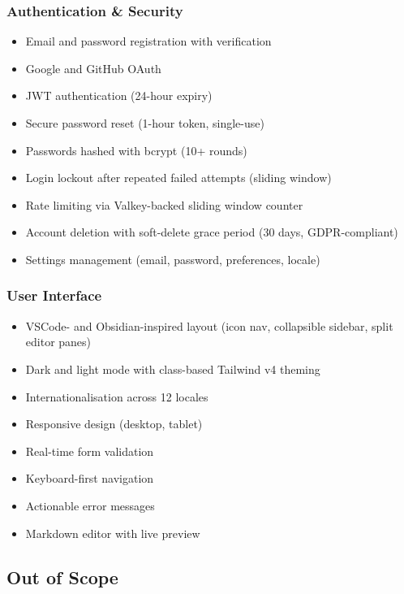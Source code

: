 \documentclass[12pt,a4paper]{article}
\begin{document}
\subsubsection{Authentication \& Security}

\begin{itemize}
    \item Email and password registration with verification
    \item Google and GitHub OAuth
    \item JWT authentication (24-hour expiry)
    \item Secure password reset (1-hour token, single-use)
    \item Passwords hashed with bcrypt (10+ rounds)
    \item Login lockout after repeated failed attempts (sliding window)
    \item Rate limiting via Valkey-backed sliding window counter
    \item Account deletion with soft-delete grace period (30 days, GDPR-compliant)
    \item Settings management (email, password, preferences, locale)
\end{itemize}

\subsubsection{User Interface}

\begin{itemize}
    \item VSCode- and Obsidian-inspired layout (icon nav, collapsible sidebar, split editor panes)
    \item Dark and light mode with class-based Tailwind v4 theming
    \item Internationalisation across 12 locales
    \item Responsive design (desktop, tablet)
    \item Real-time form validation
    \item Keyboard-first navigation
    \item Actionable error messages
    \item Markdown editor with live preview
\end{itemize}

\subsection{Out of Scope}
\end{document}
